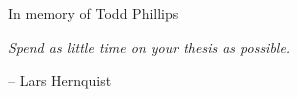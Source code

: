 \begin{acknowledgments}










\end{acknowledgments}
\begin{dedication}
  In memory of Todd Phillips
\end{dedication}
\begin{epigraph}
\textit{Spend as little time on your thesis as possible.}

\vspace{3cm}
\hspace{9cm} -- Lars Hernquist
\end{epigraph}